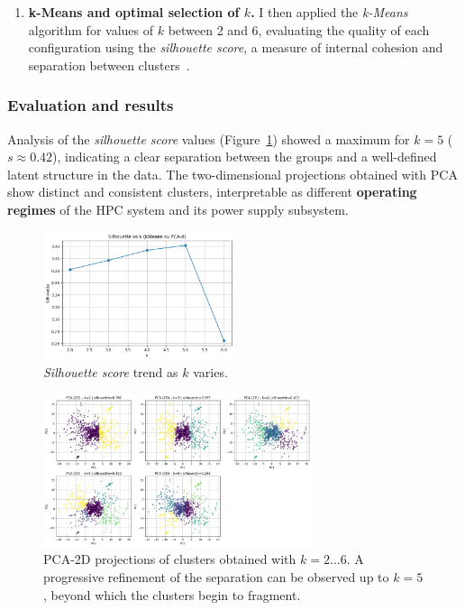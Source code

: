 \begin{enumerate}
  \item \textbf{k-Means and optimal selection of $k$.}  
  I then applied the \emph{k-Means} algorithm for values of $k$ between 2 and 6, evaluating the quality of each configuration using the \emph{silhouette score}, a measure of internal cohesion and separation between clusters~\cite{rousseeuw1987silhouettes}.
\end{enumerate}

\subsubsection{Evaluation and results}

Analysis of the \emph{silhouette score} values (Figure~\ref{fig:silhouette}) showed a maximum for $k=5$ ($s \approx 0.42$), indicating a clear separation between the groups and a well-defined latent structure in the data.  
The two-dimensional projections obtained with PCA show distinct and consistent clusters, interpretable as different \textbf{operating regimes} of the HPC system and its power supply subsystem.

\begin{figure}[H]
\centering
\includegraphics[width=0.50\textwidth]{images/silhouette_plot.png}
\caption{\emph{Silhouette score} trend as $k$ varies.}
\label{fig:silhouette}
\end{figure}

\begin{figure}[H]
\centering
\includegraphics[width=0.70\textwidth]{images/pca2d_all_k.png}
\caption{PCA-2D projections of clusters obtained with $k = 2 \dots 6$.  
A progressive refinement of the separation can be observed up to $k=5$, beyond which the clusters begin to fragment.}
\label{fig:pca2d_all_k}
\end{figure}

